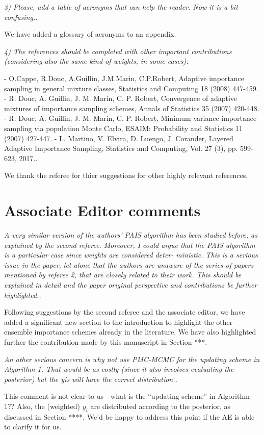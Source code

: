 \documentclass{article}
\newcommand{\comment}[2]{\vspace{0.6cm}{\bf Comment:} {\it #1.}

\vspace{0.3cm}{\bf Answer:} #2}
\begin{document}
\comment{3) Please, add a table of acronyms that can help the reader. Now it is a bit confusing.}{We have added a glossary of acronyms to an appendix.} 

\comment{4) The references should be completed with other important contributions (considering also the same kind of weights, in some cases): 

- O.Cappe, R.Douc, A.Guillin, J.M.Marin, C.P.Robert, Adaptive importance sampling in general mixture classes, Statistics and Computing 18 (2008) 447-459. 
- R. Douc, A. Guillin, J. M. Marin, C. P. Robert, Convergence of adaptive mixtures of importance sampling schemes, Annals of Statistics 35 (2007) 420-448. 
- R. Douc, A. Guillin, J. M. Marin, C. P. Robert, Minimum variance importance sampling via population Monte Carlo, ESAIM: Probability and Statistics 11 (2007) 427-447. 
- L. Martino, V. Elvira, D. Luengo, J. Corander, Layered Adaptive Importance Sampling, Statistics and Computing, Vol. 27 (3), pp. 599-623, 2017.}{We thank the referee for thier suggestions for other highly relevant references.}

\section*{Associate Editor comments}
\comment{A very similar version of the authors’ PAIS algorithm has been studied before, as explained by the second referee. Moreover, I could argue that the PAIS algorithm is a particular case since weights are considered deter- ministic. This is a serious issue in the paper, let alone that the authors are unaware of the series of papers mentioned by referee 2, that are closely related to their work.
This should be explained in detail and the paper original perspective and contributions be further highlighted.}{Following suggestions by the second referee and the associate editor, we have added a significant new section to the introduction to highlight the other ensemble importance schemes already in the literature. We have also highlighted further the contribution made by this manuscript in Section ***.}

\comment{An other serious concern is why not use PMC-MCMC for the updating scheme in Algorithm 1. That would be as costly (since it also involves evaluating the posterior) but the yis will have the correct distribution.}{This comment is not clear to us - what is the ``updating scheme'' in Algorithm 1?? Also, the (weighted) $y_i$ are distributed according to the posterior, as discussed in Section ****. We'd be happy to address this point if the AE is able to clarify it for us.}
\end{document}

